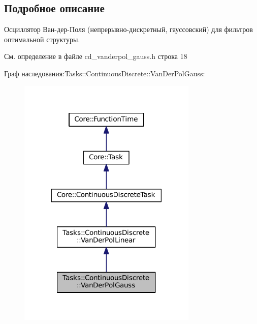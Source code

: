 \subsection{Подробное описание}
Осциллятор Ван-\/дер-\/Поля (непрерывно-\/дискретный, гауссовский) для фильтров оптимальной структуры. 

См. определение в файле cd\+\_\+vanderpol\+\_\+gauss.\+h строка 18



Граф наследования\+:Tasks\+:\+:Continuous\+Discrete\+:\+:Van\+Der\+Pol\+Gauss\+:\nopagebreak
\begin{figure}[H]
\begin{center}
\leavevmode
\includegraphics[width=242pt]{class_tasks_1_1_continuous_discrete_1_1_van_der_pol_gauss__inherit__graph}
\end{center}
\end{figure}


